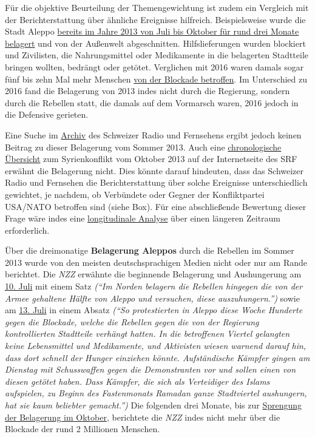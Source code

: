 Für die objektive Beurteilung der Themengewichtung ist zudem ein
Vergleich mit der Berichterstattung über ähnliche Ereignisse hilfreich.
Beispielsweise wurde die Stadt Aleppo
\href{http://www.thealeppoproject.com/aleppo-conflict-timeline-2013/}{bereits
im Jahre 2013 von Juli bis Oktober für rund drei Monate belagert} und
von der Außenwelt abgeschnitten. Hilfslieferungen wurden blockiert und
Zivilisten, die Nahrungsmittel oder Medikamente in die belagerten
Stadtteile bringen wollten, bedrängt oder getötet. Verglichen mit 2016
waren damals sogar fünf bis zehn Mal mehr Menschen
\href{https://web.archive.org/web/20170623121133/https://www.al-monitor.com/pulse/originals/2013/07/aleppo-syria-rebel-siege-assad.html}{von
der Blockade betroffen}. Im Unterschied zu 2016 fand die Belagerung von
2013 indes nicht durch die Regierung, sondern durch die Rebellen statt,
die damals auf dem Vormarsch waren, 2016 jedoch in die Defensive
gerieten.

Eine Suche im
\href{http://www.srf.ch/play/tv/sendungen-nach-datum?date=15-07-2013}{Archiv}
des Schweizer Radio und Fernsehens ergibt jedoch keinen Beitrag zu
dieser Belagerung vom Sommer 2013. Auch eine
\href{http://www.srf.ch/news/international/der-buergerkrieg-in-syrien-im-zeitraffer}{chronologische
Übersicht} zum Syrienkonflikt vom Oktober 2013 auf der Internetseite des
SRF erwähnt die Belagerung nicht. Dies könnte darauf hindeuten, dass das
Schweizer Radio und Fernsehen die Berichterstattung über solche
Ereignisse unterschiedlich gewichtet, je nachdem, ob Verbündete oder
Gegner der Konfliktpartei USA/NATO betroffen sind (siehe Box). Für eine
abschließende Bewertung dieser Frage wäre indes eine
\href{https://swprs.org/srf-ombudsstelle-im-faktencheck/}{longitudinale
Analyse} über einen längeren Zeitraum erforderlich.

Über die drei­monatige \textbf{Belagerung Aleppos} durch die Rebellen im
Sommer 2013 wurde von den meisten deutsch­sprachigen Medien nicht oder
nur am Rande berichtet. Die \emph{NZZ} erwähnte die beginnende
Belagerung und Aushungerung am
\href{http://www.nzz.ch/kaempfe-in-homs-und-aleppo-eskalieren-1.18113802}{10.
Juli} mit einem Satz \emph{(``Im Norden belagern die Rebellen hingegen
die von der Armee gehaltene Hälfte von Aleppo und versuchen, diese
auszuhungern.'')} sowie am
\href{http://www.nzz.ch/machtkaempfe-im-befreiten-syrien-1.18115794}{13.
Juli} in einem Absatz \emph{(``So protestierten in Aleppo diese Woche
Hunderte gegen die Blockade, welche die Rebellen gegen die von der
Regierung kontrollierten Stadtteile verhängt hatten. In die betroffenen
Viertel gelangten keine Lebens­mittel und Medi­ka­mente, und Aktivisten
wiesen warnend darauf hin, dass dort schnell der Hunger einziehen
könnte. Aufständische Kämpfer gingen am Dienstag mit Schuss­waffen gegen
die Demonstranten vor und sollen einen von diesen getötet haben.}
\emph{Dass Kämpfer, die sich als Verteidiger des Islams aufspielen, zu
Beginn des Fasten­monats Ramadan ganze Stadt­viertel aushungern, hat sie
kaum beliebter gemacht.'')} Die folgenden drei Monate, bis zur
\href{http://www.thealeppoproject.com/aleppo-conflict-timeline-2013/}{Sprengung
der Belagerung im Oktober}, berichtete die \emph{NZZ} indes nicht mehr
über die Blockade der rund 2 Millionen Menschen.

